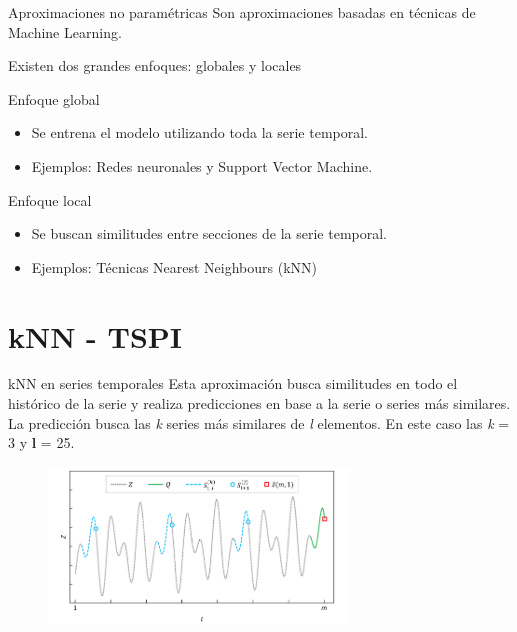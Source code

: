 \documentclass[12pt, aspectratio=169]{beamer} %
\begin{document}
\begin{frame}{Aproximaciones no paramétricas}
    Son aproximaciones basadas en técnicas de Machine Learning.
    
    Existen dos grandes enfoques: globales y locales
    \begin{block}{Enfoque global}
      \begin{itemize}
      \item Se entrena el modelo utilizando toda la serie temporal.
      \item Ejemplos: Redes neuronales y Support Vector Machine.
      \end{itemize}
    \end{block}

    \begin{block}{Enfoque local}
      \begin{itemize}
      \item Se buscan similitudes entre secciones de la serie temporal.
      \item Ejemplos: Técnicas Nearest Neighbours (kNN)
      \end{itemize}
    \end{block}

\end{frame}



\section{kNN - TSPI}
\begin{frame}{kNN en series temporales}
  Esta aproximación busca similitudes en todo el histórico de la serie y realiza predicciones en base a la serie o series más similares.
  La predicción busca las \textit{k} series más similares de \textit{l} elementos. En este caso las \textit{k} = 3 y \textbf{l} = 25.
  \begin{figure}
  \includegraphics[width=8cm]{20210312_1_knn_summary.png}
  \label{fig:ejemplo_knn_ts}
\end{figure}
\end{frame}
\end{document}
